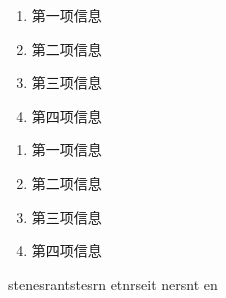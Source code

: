 \documentclass[12pt,a4paper]{article}
\begin{document}



\begin{enumerate}
    \item 第一项信息
    \item 第二项信息
    \item 第三项信息
    \item 第四项信息
\end{enumerate}


\begin{enumerate}[label=\chinese{enumi}、] %
    \item 第一项信息
    \item 第二项信息
    \item 第三项信息
    \item 第四项信息
\end{enumerate}


stenesrantstesrn etnrseit nersnt en
\end{document}
